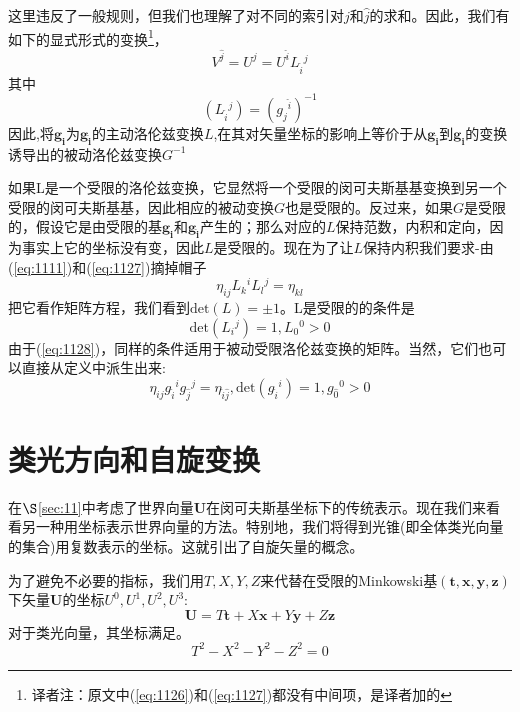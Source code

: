 \documentclass[utf8]{ctexbook}
\numberwithin{equation}{section}
\begin{document}
这里违反了一般规则，但我们也理解了对不同的索引对$j$和$\hat{j}$的求和。因此，我们有如下的显式形式的变换\footnote{译者注：原文中(\ref{eq:1126})和(\ref{eq:1127})都没有中间项，是译者加的}，
\begin{equation}
    V^{\hat{j}}=U^j=U^{\hat{i}}L_{\hat{i}}{}^{j}\label{eq:1127}
\end{equation}
其中
\begin{equation}
    (L_{\hat{i}}{}^{j})=(g_{j}{}^{\hat{i}})^{-1}\label{eq:1128}
\end{equation}
因此,将$\mathbf{g_i}$为$\mathbf{g_{\hat{i}}}$的主动洛伦兹变换$L$,在其对矢量坐标的影响上等价于从$\mathbf{g_{\hat{i}}}$到$\mathbf{g_i}$的变换诱导出的被动洛伦兹变换$G^{-1}$

如果L是一个受限的洛伦兹变换，它显然将一个受限的闵可夫斯基基变换到另一个受限的闵可夫斯基基，因此相应的被动变换$G$也是受限的。反过来，如果$G$是受限的，假设它是由受限的基$\mathbf{g_i}$和$\mathbf{g_{\hat{i}}}$产生的；那么对应的$L$保持范数，内积和定向，因为事实上它的坐标没有变，因此$L$是受限的。现在为了让$L$保持内积我们要求-由(\ref{eq:1111})和(\ref{eq:1127})摘掉帽子
\begin{equation}
    \eta_{ij}L_{k}{}^{i}L_{l}{}^{j}=\eta_{kl}
\end{equation}
把它看作矩阵方程，我们看到$\mathrm{det}(L)=\pm 1$。L是受限的的条件是
\begin{equation}
    \mathrm{det}(L_i{}^j)= 1, L_0{}^0 > 0
\end{equation}
由于(\ref{eq:1128})，同样的条件适用于被动受限洛伦兹变换的矩阵。当然，它们也可以直接从定义中派生出来:
\begin{equation}
    \eta_{ij}g_{\hat{i}}{}^{i}g_{\hat{j}}{}^{j}=\eta_{{\hat{i}{\hat{j}}}},\mathrm{det}(g_{\hat{i}}{}^{i})=1,g_{\hat{0}}{}^{0}>0\label{eq:1121}
\end{equation}
\section{类光方向和自旋变换}\label{sec:1.2}
在$\S$\ref{sec:11}中考虑了世界向量$\mathbf{U}$在闵可夫斯基坐标下的传统表示。现在我们来看看另一种用坐标表示世界向量的方法。特别地，我们将得到光锥(即全体类光向量的集合)用复数表示的坐标。这就引出了自旋矢量的概念。

为了避免不必要的指标，我们用$T,X,Y,Z$来代替在受限的Minkowski基$\mathbf{(t, x, y, z)}$下矢量$\mathbf{U}$的坐标$U^0,U^1,U^2,U^3$:
\begin{equation}
    \mathbf{U}= T\mathbf{t} +X\mathbf{x}+ Y\mathbf{y}+ Z\mathbf{z}\label{eq:121}
\end{equation}
对于类光向量，其坐标满足。
\begin{equation}
    T^2-X^2-Y^2-Z^2=0\label{eq:122}
\end{equation}
\end{document}
